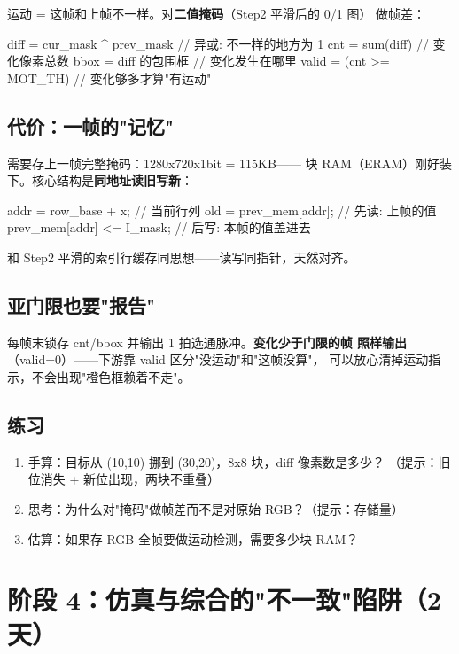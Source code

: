 \documentclass[11pt]{ctexart}
\begin{document}
运动 = 这帧和上帧不一样。对\textbf{二值掩码}（Step2 平滑后的 0/1 图）
做帧差：

\begin{Verilog}
diff = cur_mask ^ prev_mask     // 异或: 不一样的地方为 1
cnt = sum(diff)                 // 变化像素总数
bbox = diff 的包围框            // 变化发生在哪里
valid = (cnt >= MOT_TH)         // 变化够多才算"有运动"
\end{Verilog}

\subsection{代价：一帧的"记忆"}

需要存上一帧完整掩码：1280x720x1bit = 115KB——
块 RAM（ERAM）刚好装下。核心结构是\textbf{同地址读旧写新}：

\begin{Verilog}
addr = row_base + x;            // 当前行列
old  = prev_mem[addr];          // 先读: 上帧的值
prev_mem[addr] <= I_mask;       // 后写: 本帧的值盖进去
\end{Verilog}

和 Step2 平滑的索引行缓存同思想——读写同指针，天然对齐。

\subsection{亚门限也要"报告"}

每帧末锁存 cnt/bbox 并输出 1 拍选通脉冲。\textbf{变化少于门限的帧
照样输出}（valid=0）——下游靠 valid 区分"没运动"和"这帧没算"，
可以放心清掉运动指示，不会出现"橙色框赖着不走"。

\subsection{练习}

\begin{enumerate}
  \item 手算：目标从 (10,10) 挪到 (30,20)，8x8 块，diff 像素数是多少？
    （提示：旧位消失 + 新位出现，两块不重叠）
  \item 思考：为什么对"掩码"做帧差而不是对原始 RGB？（提示：存储量）
  \item 估算：如果存 RGB 全帧要做运动检测，需要多少块 RAM？
\end{enumerate}

\section{阶段 4：仿真与综合的"不一致"陷阱（2 天）}
\end{document}
